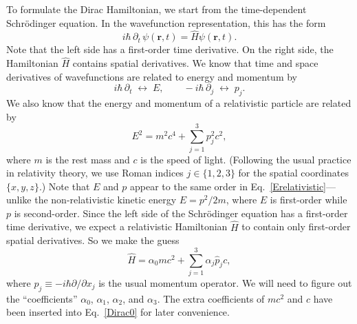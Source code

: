 \documentclass[pra,12pt]{revtex4}
\begin{document}
To formulate the Dirac Hamiltonian, we start from the time-dependent
Schr\"odinger equation.  In the wavefunction representation, this has
the form
\begin{equation}
  i\hbar\, \partial_t\, \psi(\mathbf{r},t)
  = \hat{H} \psi(\mathbf{r},t).
\end{equation}
Note that the left side has a first-order time derivative.  On the
right side, the Hamiltonian $\hat{H}$ contains spatial derivatives.
We know that time and space derivatives of wavefunctions are related
to energy and momentum by
\begin{equation}
    i\hbar\, \partial_t\; \leftrightarrow \;
    E, \qquad
    -i\hbar\, \partial_j \;\leftrightarrow \;
    p_j.
\end{equation}
We also know that the energy and momentum of a relativistic particle
are related by
\begin{equation}
  E^2 = m^2c^4 + \sum_{j=1}^3 p_j^2c^2,
  \label{Erelativistic}
\end{equation}
where $m$ is the rest mass and $c$ is the speed of light.  (Following
the usual practice in relativity theory, we use Roman indices $j \in
\{1,2,3\}$ for the spatial coordinates $\{x,y,z\}$.)  Note that $E$
and $p$ appear to the same order in Eq.~\eqref{Erelativistic}---unlike
the non-relativistic kinetic energy $E = p^2/2m$, where $E$ is
first-order while $p$ is second-order.  Since the left side of the
Schr\"odinger equation has a first-order time derivative, we expect a
relativistic Hamiltonian $\hat{H}$ to contain only first-order spatial
derivatives.  So we make the guess
\begin{equation}
  \hat{H} = \alpha_0 mc^2 + \sum_{j=1}^3 \alpha_j \hat{p}_j c,
  \label{Dirac0}
\end{equation}
where $\hat{p}_j \equiv -i\hbar \partial/\partial x_j$ is the usual
momentum operator.  We will need to figure out the ``coefficients''
$\alpha_0$, $\alpha_1$, $\alpha_2$, and $\alpha_3$.  The extra
coefficients of $mc^2$ and $c$ have been inserted into
Eq.~\eqref{Dirac0} for later convenience.
\end{document}
